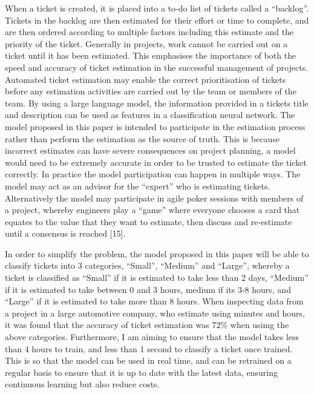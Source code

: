 \documentclass{UoYCSproject}
\begin{document}
When a ticket is created, it is placed into a to-do list of tickets called a “backlog”.
Tickets in the backlog are then estimated for their effort or time to complete, and are then ordered according to multiple factors including this estimate and the priority of the ticket.
Generally in projects, work cannot be carried out on a ticket until it has been estimated.
This emphasises the importance of both the speed and accuracy of ticket estimation in the successful management of projects.
Automated ticket estimation may enable the correct prioritisation of tickets before any estimation activities are carried out by the team or members of the team.
By using a large language model, the information provided in a tickets title and description can be used as features in a classification neural network.
The model proposed in this paper is intended to participate in the estimation process rather than perform the estimation as the source of truth.
This is because incorrect estimates can have severe consequences on project planning, a model would need to be extremely accurate in order to be trusted to estimate the ticket correctly.
In practice the model participation can happen in multiple ways.
The model may act as an advisor for the “expert” who is estimating tickets.
Alternatively the model may participate in agile poker sessions with members of a project, whereby engineers play a “game” where everyone chooses a card that equates to the value that they want to estimate, then discuss and re-estimate until a consensus is reached [15]. \par

In order to simplify the problem, the model proposed in this paper will be able to classify tickets into 3 categories, “Small”, “Medium” and “Large”, whereby a ticket is classified as “Small” if it is estimated to take less than 2 days, “Medium” if it is estimated to take between 0 and 3 hours, medium if its 3-8 hours, and “Large” if it is estimated to take more than 8 hours.
When inspecting data from a project in a large automotive company, who estimate using minutes and hours, it was found that the accuracy of ticket estimation was 72\% when usimg the above categories.
Furthermore, I am aiming to ensure that the model takes less than 4 hours to train, and less than 1 second to classify a ticket once trained.
This is so that the model can be used in real time, and can be retrained on a regular basis to ensure that it is up to date with the latest data, ensuring continuous learning but also reduce costs. \par
\end{document}
